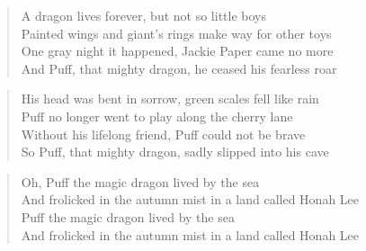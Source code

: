 \documentclass[a4paper,oneside,onecolumn]{article}
\begin{document}
\begin{verse}
A dragon lives forever, but not so little boys\\
Painted wings and giant's rings make way for other toys\\
One gray night it happened, Jackie Paper came no more\\
And Puff, that mighty dragon, he ceased his fearless roar\\

\end{verse}
\begin{verse}
His head was bent in sorrow, green scales fell like rain\\
Puff no longer went to play along the cherry lane\\
Without his lifelong friend, Puff could not be brave\\
So Puff, that mighty dragon, sadly slipped into his cave\\

\end{verse}
\begin{verse}
Oh, Puff the magic dragon lived by the sea\\
And frolicked in the autumn mist in a land called Honah Lee\\
Puff the magic dragon lived by the sea\\
And frolicked in the autumn mist in a land called Honah Lee\\
\end{verse}
\end{document}
